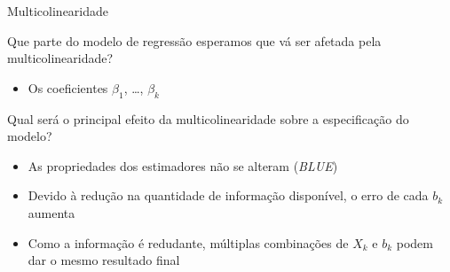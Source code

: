 \documentclass{beamer}\usepackage[]{graphicx}\usepackage[]{color}
\begin{document}
\begin{frame}{Multicolinearidade}

Que parte do modelo de regressão esperamos que vá ser afetada pela multicolinearidade?  \pause

\begin{itemize}

\item Os coeficientes $\beta _1$, \ldots, $\beta _k$ \pause

\end{itemize}

Qual será o principal efeito da multicolinearidade sobre a especificação do modelo? \pause

\begin{itemize}

\item As propriedades dos estimadores não se alteram (\emph{BLUE}) \pause

\item Devido à redução na quantidade de informação disponível, o erro de cada $b_k$ aumenta \pause

\item Como a informação é redudante, múltiplas combinações de $X_k$ e $b_k$ podem dar o mesmo resultado final 
 
\end{itemize}

\end{frame}
\end{document}
